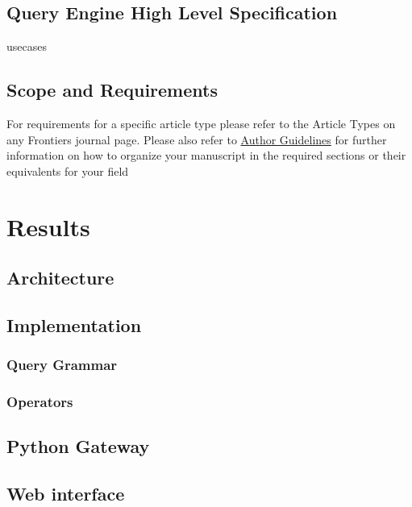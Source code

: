 \documentclass[utf8]{frontiersSCNS} %
\begin{document}
\subsection{Query Engine High Level Specification}
\label{Query_engine_specification}
usecases

\subsection{Scope and Requirements}
\label{Scope_and_requirements}


For requirements for a specific article type please refer to the Article Types on any Frontiers journal page. Please also refer to  \href{http://home.frontiersin.org/about/author-guidelines#Sections}{Author Guidelines} for further information on how to organize your manuscript in the required sections or their equivalents for your field


\section{Results}
\label{results}

\subsection{Architecture}
\label{Architecture}

\subsection{Implementation}
\label{Implementation}

\subsubsection{Query Grammar}
\label{Query_Grammar}
\subsubsection{Operators}


\subsection{Python Gateway}
\label{Python_Gateway}

\subsection{Web interface}
\label{web_interface}
\end{document}
